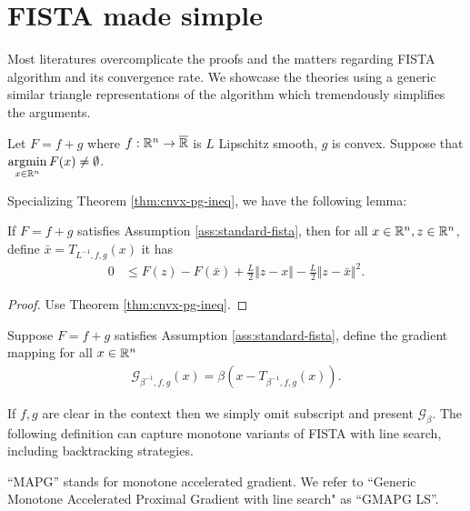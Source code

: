 \documentclass[12pt]{report}
\begin{document}
    \section{FISTA made simple}
        Most literatures overcomplicate the proofs and the matters regarding FISTA algorithm and its convergence rate. 
        We showcase the theories using a generic similar triangle representations of the algorithm which tremendously simplifies the arguments. 
        \begin{assumption}\label{ass:standard-fista}
            Let $F = f + g$ where $f:\mathbb R^n\rightarrow \overline {\mathbb R}$ is $L$ Lipschitz smooth, $g$ is convex. 
            Suppose that $\mathop{\rm argmin}\limits_{x \in \mathbb R^n} F(x)\neq \emptyset$. 
        \end{assumption}
        Specializing Theorem \ref{thm:cnvx-pg-ineq}, we have the following lemma: 
        \begin{lemma}
            If $F = f + g$ satisfies Assumption \ref{ass:standard-fista}, then for all $x \in \mathbb R^n, z \in \mathbb R^n$, define $\bar x = T_{L^{-1}, f, g}(x)$ it has 
            \begin{align*}
                0 &\le F(z) - F(\bar x) + \frac{L}{2}\Vert z - x\Vert - \frac{L}{2}\Vert z - \bar x\Vert^2. 
            \end{align*}
        \end{lemma}
        \begin{proof}
            Use Theorem \ref{thm:cnvx-pg-ineq}. 
        \end{proof}
        \begin{definition}
            Suppose $F = f + g$ satisfies Assumption \ref{ass:standard-fista}, define the gradient mapping for all $x \in \mathbb R^n$
            \begin{align*}
                \mathcal G_{\beta^{-1}, f, g}(x) = \beta(x - T_{\beta^{-1}, f, g}(x)). 
            \end{align*}
        \end{definition}
        If $f, g$ are clear in the context then we simply omit subscript and present $\mathcal G_\beta$. 
        The following definition can capture monotone variants of FISTA with line search, including backtracking strategies. 
        \par
        ``MAPG'' stands for monotone accelerated gradient. 
        We refer to ``Generic Monotone Accelerated Proximal Gradient with line search" as ``GMAPG LS''. 
\end{document}
